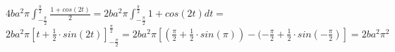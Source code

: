 $4ba^2\pi\int_{-\frac{\pi}{2}}^{\frac{\pi}{2}}\frac{1+cos(2t)}{2} = 2ba^2\pi\int_{-\frac{\pi}{2}}^{\frac{\pi}{2}}1+cos(2t) dt =$\\
\vspace{1cm}
$2ba^2\pi\left[t+\frac{1}{2}\cdot sin(2t)   \right]_{-\frac{\pi}{2}}^\frac{\pi}{2} = 2ba^2\pi\left[(\frac{\pi}{2}+\frac{1}{2}\cdot sin(\pi) )-(-\frac{\pi}{2}+\frac{1}{2}\cdot sin(-\frac{\pi}{2})   \right] = \boxed{2ba^2\pi^2}$






 






    
    
    
    
    
    
    
    
